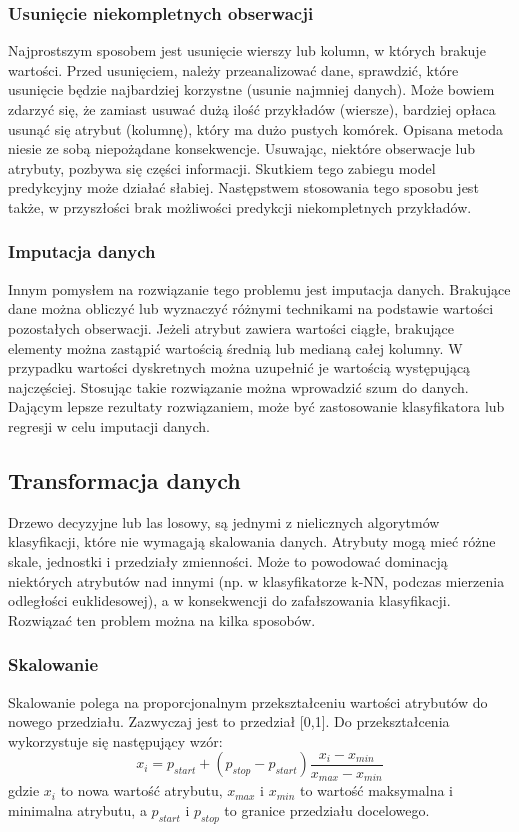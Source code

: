 \subsubsection{Usunięcie niekompletnych obserwacji}
Najprostszym sposobem jest usunięcie wierszy lub kolumn, w których brakuje wartości. Przed usunięciem, należy przeanalizować dane, sprawdzić, które usunięcie będzie najbardziej korzystne (usunie najmniej danych). Może bowiem zdarzyć się, że zamiast usuwać dużą ilość przykładów (wiersze), bardziej opłaca usunąć się atrybut (kolumnę), który ma dużo pustych komórek. Opisana metoda niesie ze sobą niepożądane konsekwencje. Usuwając, niektóre obserwacje lub atrybuty, pozbywa się części informacji. Skutkiem tego zabiegu model predykcyjny może działać słabiej. Następstwem stosowania tego sposobu jest także, w przyszłości brak możliwości predykcji niekompletnych przykładów.
\subsubsection{Imputacja danych}
Innym pomysłem na rozwiązanie tego problemu jest imputacja danych. Brakujące dane można obliczyć lub wyznaczyć różnymi technikami na podstawie wartości pozostałych obserwacji. Jeżeli atrybut zawiera wartości ciągłe, brakujące elementy można zastąpić wartością średnią lub medianą całej kolumny. W przypadku wartości dyskretnych można uzupełnić je wartością występującą najczęściej. Stosując takie rozwiązanie można wprowadzić szum do danych. Dającym lepsze rezultaty rozwiązaniem, może być zastosowanie klasyfikatora lub regresji w celu imputacji danych.
\subsection{Transformacja danych}
Drzewo decyzyjne lub las losowy, są jednymi z nielicznych algorytmów klasyfikacji, które nie wymagają skalowania danych. Atrybuty mogą mieć różne skale, jednostki i przedziały zmienności. Może to powodować dominacją niektórych atrybutów nad innymi (np. w klasyfikatorze k-NN, podczas mierzenia odległości euklidesowej), a w konsekwencji do zafałszowania klasyfikacji. Rozwiązać ten problem można na kilka sposobów.
\subsubsection{Skalowanie}
Skalowanie polega na proporcjonalnym przekształceniu wartości atrybutów do nowego przedziału. Zazwyczaj jest to przedział [0,1]. Do przekształcenia wykorzystuje się następujący wzór:
\[x_i=p_{start}+(p_{stop}-p_{start})\frac{x_i-x_{min}}{x_{max}-x_{min}}\]
gdzie $x_i$ to nowa wartość atrybutu, $x_{max}$ i $x_{min}$ to wartość maksymalna i minimalna atrybutu, a $p_{start}$ i $p_{stop}$ to granice przedziału docelowego.
